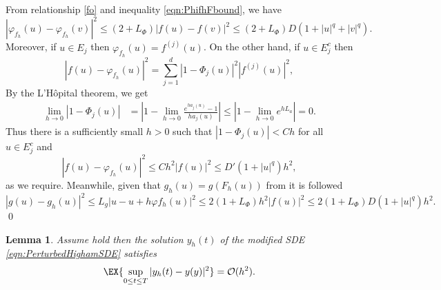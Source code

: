 \documentclass[sort&compress, preprint]{elsarticle}
\theoremstyle{definition}
\theoremstyle{plain}%
\newtheorem{lem}{Lemma}[section]
\theoremstyle{remark}
\begin{document}
\begin{pf}
	From relationship \eqref{fo} and inequality \eqref{eqn:PhifhFbound}, we have
	\begin{equation*}
		|\varphi_{f_h}(u) - \varphi_{f_h}(v)|^2
		\leq
			(2 + L_{\Phi}) |f(u) - f(v)|^2 
			\leq
				(2 + L_{\Phi}) D (1 + |u|^q +|v|^q). 
	\end{equation*}
	Moreover, if $u \in E_j$ then $\varphi_{f_h}(u) = f^{(j)}(u)$. On the other hand,  if $u\in E_j^c$ then
	$$
		|f(u) - \varphi_{f_h}(u)|^2
		=
		\sum_{j=1}^d
			|1-\Phi_j(u)|^2 |f^{(j)}(u)|^2,	
	$$
	 By the L'H\^{o}pital 
	theorem, we get
	\begin{align*}
		\lim_{h \to 0} |1-\Phi_j(u)| 
			&= \left|
				1-\lim_{h\to 0} \frac{e^{h a_j(u)}-1}{h a_j(u)}
			\right|			
			\leq 
				\left|
					1-\lim_{h\to 0} e^{h L_a}
				\right|=0.			
	\end{align*}
	Thus there is a sufficiently small $h>0$  such that
	$|1-\Phi_j(u)|<C h$ for all $u\in E_j^c$ and
	$$
		|f(u) - \varphi_{f_h}(u)|^2
		\leq
		Ch^2 |f(u)|^2
		\leq D'(1+|u|^q)h^2,	
	$$
	as we require. Meanwhile, given that $g_h(u)=g(F_h(u))$ from  it is followed
	\begin{equation*}
		|g(u) - g_h(u)|^2 
		\leq
			L_g |u - u +h \varphi{f_h}(u)|^2 
		\leq 
			2(1+L_{\Phi})h^2 |f(u)|^2
		\leq
			2(1+L_{\Phi}) D(1+|u|^q) h^2. 
	\end{equation*}
	\qed
\end{pf}
%
\begin{lem}\label{lem:yhyOh}
	Assume  hold then the solution $y_h(t)$ of 
	the modified SDE \eqref{eqn:PerturbedHighamSDE}
	satisfies
	\begin{equation}
		\EX{
			\sup_{0\leq t \leq T}
			|y_h(t) - y(y)|^2	
		} = \mathcal{O}(h^2).
	\end{equation}	
\end{lem}
\end{document}
